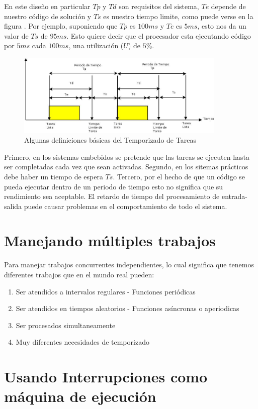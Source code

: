 \documentclass[12pt, twoside]{report}
\begin{document}
En este diseño en particular $Tp$ y $Td$ son requisitos del sistema, $Te$ depende de nuestro código de solución y $Ts$ es nuestro tiempo limite, como puede verse en la figura . Por ejemplo, suponiendo que $Tp$ es $100ms$ y $Te$ es $5ms$, esto nos da un valor de $Ts$ de $95ms$. Esto quiere decir que el procesador esta ejecutando código por $5ms$ cada $100ms$, una utilización ($U$) de $5$\%. 

\begin{figure}
\centering
\includegraphics[width=100mm]{timing}
\caption{Algunas definiciones básicas del Temporizado de Tareas}
\label{cap1:003}
\end{figure}
Primero, en los sistemas embebidos se pretende que las tareas se ejecuten hasta ser completadas cada vez que sean activadas. Segundo, en los sitemas prácticos debe haber un tiempo de espera $Ts$. Tercero, por el hecho de que un código se pueda ejecutar dentro de un periodo de tiempo esto no significa que su rendimiento sea aceptable. El retardo de tiempo del procesamiento de entrada-salida puede causar problemas en el comportamiento de todo el sistema.


\section{Manejando múltiples trabajos}
Para manejar trabajos concurrentes independientes, lo cual significa que tenemos diferentes trabajos que en el mundo real pueden:
\begin{enumerate}
	\item Ser atendidos a intervalos regulares - Funciones periódicas
	\item Ser atendidos en tiempos aleatorios - Funciones asíncronas o aperiodicas
	\item Ser procesados simultaneamente
	\item Muy diferentes necesidades de temporizado
\end{enumerate}

\section{Usando Interrupciones como máquina de ejecución}
\end{document}
